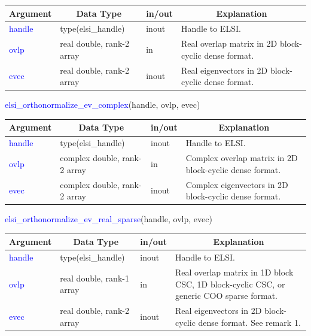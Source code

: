\documentclass{report}
\newcommand{\tcb}[1]{\textcolor{blue}{#1}}
\begin{document}
\begin{tabular}[]{|p{20mm}|p{45mm}|p{15mm}|p{85mm}|}
\hline
\multicolumn{1}{|c|}{\textbf{Argument}} & \multicolumn{1}{c|}{\textbf{Data Type}} & \multicolumn{1}{c|}{\textbf{in/out}} & \multicolumn{1}{c|}{\textbf{Explanation}}\\
\hline
\tcb{handle} & type(elsi\_handle)        & inout & Handle to ELSI.\\
\hline
\tcb{ovlp}   & real double, rank-2 array & in    & Real overlap matrix in 2D block-cyclic dense format.\\
\hline
\tcb{evec}   & real double, rank-2 array & inout & Real eigenvectors in 2D block-cyclic dense format.\\
\hline
\end{tabular}

\begin{labeling}{\hspace{6cm}}
\item [\hspace{0.3cm} \tcb{elsi\_orthonormalize\_ev\_complex}(handle, ovlp, evec)]
\end{labeling}

\begin{tabular}[]{|p{20mm}|p{45mm}|p{15mm}|p{85mm}|}
\hline
\multicolumn{1}{|c|}{\textbf{Argument}} & \multicolumn{1}{c|}{\textbf{Data Type}} & \multicolumn{1}{c|}{\textbf{in/out}} & \multicolumn{1}{c|}{\textbf{Explanation}}\\
\hline
\tcb{handle} & type(elsi\_handle)           & inout & Handle to ELSI.\\
\hline
\tcb{ovlp}   & complex double, rank-2 array & in    & Complex overlap matrix in 2D block-cyclic dense format.\\
\hline
\tcb{evec}   & complex double, rank-2 array & inout & Complex eigenvectors in 2D block-cyclic dense format.\\
\hline
\end{tabular}

\newpage
\begin{labeling}{\hspace{6cm}}
\item [\hspace{0.3cm} \tcb{elsi\_orthonormalize\_ev\_real\_sparse}(handle, ovlp, evec)]
\end{labeling}

\begin{tabular}[]{|p{20mm}|p{45mm}|p{15mm}|p{85mm}|}
\hline
\multicolumn{1}{|c|}{\textbf{Argument}} & \multicolumn{1}{c|}{\textbf{Data Type}} & \multicolumn{1}{c|}{\textbf{in/out}} & \multicolumn{1}{c|}{\textbf{Explanation}}\\
\hline
\tcb{handle} & type(elsi\_handle)        & inout & Handle to ELSI.\\
\hline
\tcb{ovlp}   & real double, rank-1 array & in    & Real overlap matrix in 1D block CSC, 1D block-cyclic CSC, or generic COO sparse format.\\
\hline
\tcb{evec}   & real double, rank-2 array & inout & Real eigenvectors in 2D block-cyclic dense format. See remark 1.\\
\hline
\end{tabular}
\end{document}
